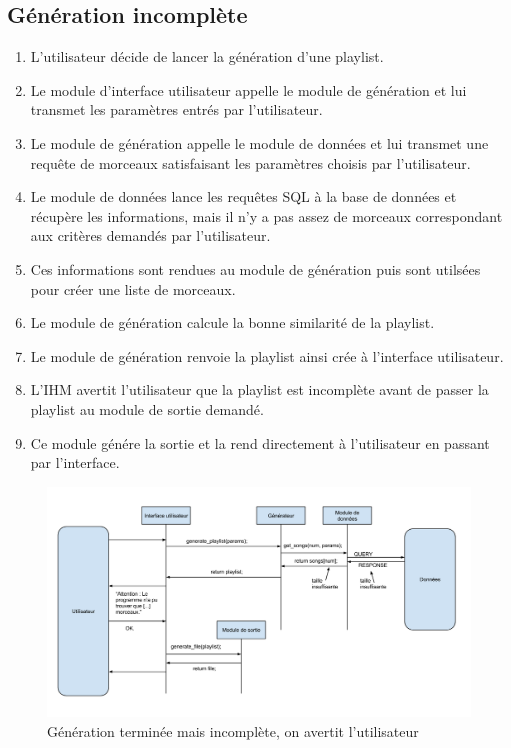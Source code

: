 \subsection{Génération incomplète}
\label{scenarii:gen:incomp}

\begin{enumerate}
\item L'utilisateur décide de lancer la génération d'une playlist.
\item Le module d'interface utilisateur appelle le module de génération et 
lui transmet les paramètres entrés par l'utilisateur.
\item Le module de génération appelle le module de données et lui transmet 
une requête de morceaux satisfaisant les paramètres choisis par l'utilisateur.
\item Le module de données lance les requêtes SQL à la base de données et
récupère les informations, mais il n'y a pas assez de morceaux correspondant 
aux critères demandés par l'utilisateur.
\item Ces informations sont rendues au module de génération puis sont 
utilsées pour créer une liste de morceaux.
\item Le module de génération calcule la bonne similarité de la playlist.
\item Le module de génération renvoie la playlist ainsi crée à l'interface 
utilisateur.
\item L'IHM avertit l'utilisateur que la playlist est incomplète avant de 
passer la playlist au module de sortie demandé.
\item Ce module génére la sortie et la rend directement à l'utilisateur en 
passant par l'interface.
\end{enumerate}

\begin{figure}[H]
\includegraphics[width=\textwidth]{data/scenarii/generation_incomplete.png}
\caption{Génération terminée mais incomplète, on avertit l'utilisateur}
\end{figure}
 

